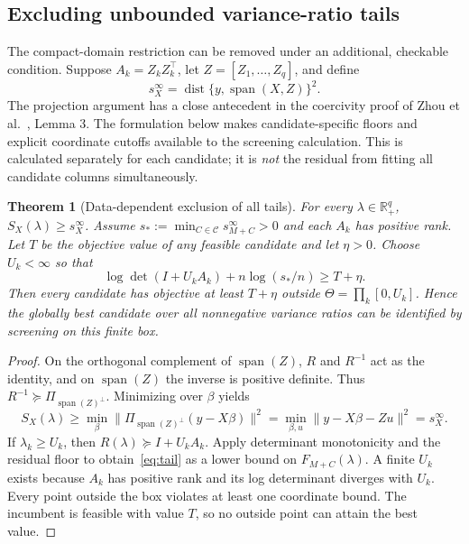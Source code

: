 \documentclass[preprint,11pt,numbers]{elsarticle}
\newtheorem{theorem}{Theorem}
\theoremstyle{remark}\newtheorem{remark}[theorem]{Remark}
\newcommand{\R}{\mathbb R}
\newcommand{\Span}{\operatorname{span}}
\newcommand{\dist}{\operatorname{dist}}
\newcommand{\calC}{\mathcal C}
\begin{document}
\subsection{Excluding unbounded variance-ratio tails}
The compact-domain restriction can be removed under an additional, checkable
condition. Suppose $A_k=Z_kZ_k^\top$, let $Z=[Z_1,\ldots,Z_q]$, and define
\begin{equation}
s_X^{\infty}=\dist\{y,\Span(X,Z)\}^2.
\end{equation}
The projection argument has a close antecedent in the coercivity proof of
Zhou et al.~\cite{zhou}, Lemma 3. The formulation below makes candidate-specific
floors and explicit coordinate cutoffs available to the screening calculation.
This is calculated separately for each candidate; it is \emph{not} the residual
from fitting all candidate columns simultaneously.

\begin{theorem}[Data-dependent exclusion of all tails]\label{thm:tail}
For every $\lambda\in\R_+^q$, $S_X(\lambda)\geq s_X^{\infty}$. Assume
$s_*:=\min_{C\in\calC}s_{M+C}^{\infty}>0$ and each $A_k$ has positive rank.
Let $T$ be the objective value of any feasible candidate and let $\eta>0$.
Choose $U_k<\infty$ so that
\begin{equation}\label{eq:tail}
\log\det(I+U_kA_k)+n\log(s_*/n)\geq T+\eta.
\end{equation}
Then every candidate has objective at least $T+\eta$ outside
$\Theta=\prod_k[0,U_k]$. Hence the globally best candidate over all nonnegative
variance ratios can be identified by screening on this finite box.
\end{theorem}
\begin{proof}
On the orthogonal complement of $\Span(Z)$, $R$ and $R^{-1}$ act as the identity,
and on $\Span(Z)$ the inverse is positive definite. Thus
$R^{-1}\succeq\Pi_{\Span(Z)^\perp}$. Minimizing over $\beta$ yields
\[
S_X(\lambda)\geq\min_{\beta}\|\Pi_{\Span(Z)^\perp}(y-X\beta)\|^2
=\min_{\beta,u}\|y-X\beta-Zu\|^2=s_X^{\infty}.
\]
If $\lambda_k\geq U_k$, then $R(\lambda)\succeq I+U_kA_k$. Apply determinant
monotonicity and the residual floor to obtain~\eqref{eq:tail} as a lower bound on
$F_{M+C}(\lambda)$. A finite $U_k$ exists because $A_k$ has positive rank and its
log determinant diverges with $U_k$. Every point outside the box violates at least
one coordinate bound. The incumbent is feasible with value $T$, so no outside point
can attain the best value.
\end{proof}
\end{document}
